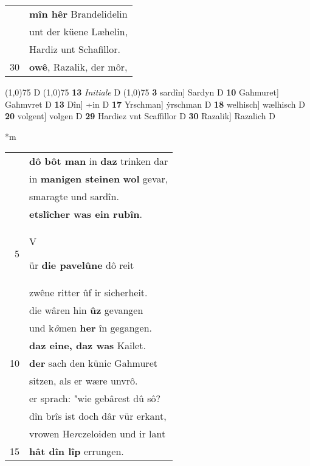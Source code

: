 \documentclass[8pt,a4paper,notitlepage]{article}
\begin{document}
\begin{table}[ht]
\begin{minipage}[t]{0.5\linewidth}
\begin{tabular}{rl}
 & \textbf{mîn hêr} Brandelidelin\\ 
 & unt der küene Læhelin,\\ 
 & Hardiz unt Schafillor.\\ 
30 & \textbf{owê}, Razalik, der môr,\\ 
\end{tabular}
\scriptsize
\line(1,0){75} \newline
D \newline
\line(1,0){75} \newline
\textbf{13} \textit{Initiale} D  \newline
\line(1,0){75} \newline
\textbf{3} sardîn] Sardyn D \textbf{10} Gahmuret] Gahmvret D \textbf{13} Dîn] ÷in D \textbf{17} Yrschman] ẏrschman D \textbf{18} welhisch] wælhisch D \textbf{20} volgent] volgen D \textbf{29} Hardiez vnt Scaffillor D \textbf{30} Razalik] Razalich D \newline
\end{minipage}
\hspace{0.5cm}
\begin{minipage}[t]{0.5\linewidth}
\small
\begin{center}*m
\end{center}
\begin{tabular}{rl}
 & \textbf{dô bôt man} in \textbf{daz} trinken dar\\ 
 & in \textbf{manigen steinen} \textbf{wol} gevar,\\ 
 & smaragte und sardîn.\\ 
 & \textbf{etslîcher was ein rubîn}.\\ 
5 & \begin{large}V\end{large}ür \textbf{die pavelûne} dô reit\\ 
 & zwêne ritter ûf ir sicherheit.\\ 
 & die wâren hin \textbf{ûz} gevangen\\ 
 & und k\textit{ô}men \textbf{her} în gegangen.\\ 
 & \textbf{daz eine, daz was} Kailet.\\ 
10 & \textbf{der} sach den künic Gahmuret\\ 
 & sitzen, als er wære unvrô.\\ 
 & er sprach: "wie gebârest dû sô?\\ 
 & dîn brîs ist doch dâr vür erkant,\\ 
 & vrowen He\textit{r}czeloiden und ir lant\\ 
15 & \textbf{hât dîn lîp} errungen.\\ 

\end{tabular}
\end{minipage}
\end{table}
\end{document}
